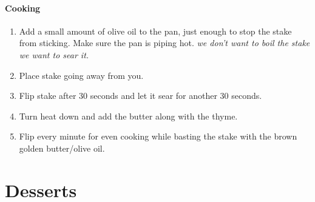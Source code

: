 \subsubsection{Cooking}
\begin{enumerate}
    \item Add a small amount of olive oil to the pan, just enough to stop the stake from sticking. Make sure the pan is piping hot. \textit{we don't want to boil the stake we want to sear it.}
    \item Place stake going away from you.
    \item Flip stake after 30 seconds and let it sear for another 30 seconds.
    \item Turn heat down and add the butter along with the thyme.
    \item Flip every minute for even cooking while basting the stake with the brown golden butter/olive oil.
\end{enumerate}


\chapter{Desserts}

